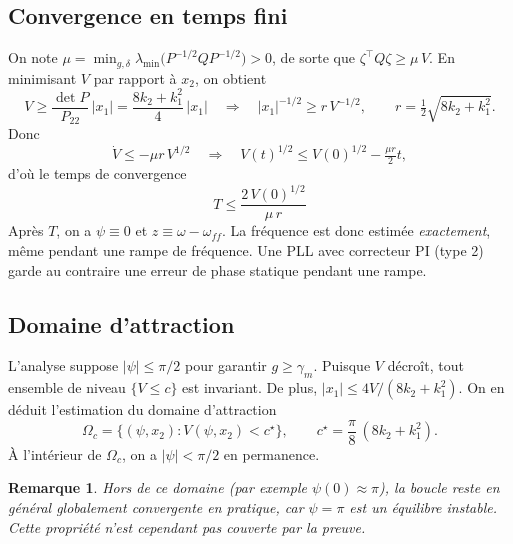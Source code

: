 \documentclass[11pt,a4paper]{article}
\newtheorem{remarque}{Remarque}
\begin{document}
\subsection{Convergence en temps fini}
On note $\mu = \min_{g,\delta}\lambda_{\min}\!\big(P^{-1/2}QP^{-1/2}\big) > 0$, de sorte que
$\zeta^\top Q\zeta \ge \mu\, V$.
En minimisant $V$ par rapport à $x_2$, on obtient
\begin{equation}
V \ge \frac{\det P}{P_{22}}\,|x_1| = \frac{8k_2+k_1^2}{4}\,|x_1|
\quad\Longrightarrow\quad
|x_1|^{-1/2} \ge r\,V^{-1/2},\qquad r=\tfrac12\sqrt{8k_2+k_1^2}.
\end{equation}
Donc
\begin{equation}
\dot V \le -\mu r\, V^{1/2}
\quad\Longrightarrow\quad
V(t)^{1/2} \le V(0)^{1/2} - \tfrac{\mu r}{2}t,
\end{equation}
d'où le temps de convergence
\begin{equation}
\boxed{\;T \le \frac{2\,V(0)^{1/2}}{\mu\, r}\;}
\end{equation}
Après $T$, on a $\psi\equiv0$ et $z\equiv\omega-\omega_{ff}$. La fréquence est donc estimée
\emph{exactement}, même pendant une rampe de fréquence. Une PLL avec correcteur PI (type 2)
garde au contraire une erreur de phase statique pendant une rampe.

\subsection{Domaine d'attraction}
L'analyse suppose $|\psi|\le\pi/2$ pour garantir $g\ge\gamma_m$. Puisque $V$ décroît, tout ensemble
de niveau $\{V\le c\}$ est invariant. De plus, $|x_1|\le 4V/(8k_2+k_1^2)$. On en déduit l'estimation
du domaine d'attraction
\begin{equation}\label{eq:omega}
\boxed{\;\Omega_c = \Big\{(\psi,x_2) : V(\psi,x_2) < c^\star\Big\},\qquad c^\star = \frac{\pi}{8}\,(8k_2+k_1^2).\;}
\end{equation}
À l'intérieur de $\Omega_c$, on a $|\psi|<\pi/2$ en permanence.

\begin{remarque}
Hors de ce domaine (par exemple $\psi(0)\approx\pi$), la boucle reste en général globalement
convergente en pratique, car $\psi=\pi$ est un équilibre instable. Cette propriété n'est cependant
pas couverte par la preuve.
\end{remarque}
\end{document}
